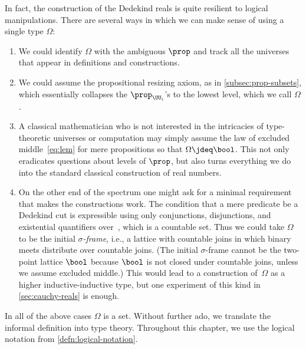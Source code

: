 In fact, the construction of the Dedekind reals is quite resilient to logical
manipulations. There are several ways in which we can make sense of using a single type
$\Omega$:
%
\begin{enumerate}

\item We could identify $\Omega$ with the ambiguous $\prop$ and track all the universes
  that appear in definitions and constructions.

\item We could assume the propositional resizing axiom,
  as in \cref{subsec:prop-subsets}, which essentially collapses the $\prop_{\UU_i}$'s to the
  lowest level, which we call $\Omega$.

\item A classical mathematician who is not interested in the intricacies of type-theoretic
  universes or computation may simply assume the law of excluded middle~\eqref{eq:lem} for
  mere propositions so that $\Omega \jdeq \bool$.
  This not only eradicates questions about
  levels of $\prop$, but also turns everything we do into the standard classical
  construction of real numbers.

\item On the other end of the spectrum one might ask for a minimal requirement that makes
  the constructions work. The condition that a mere predicate be a Dedekind cut is
  expressible using only conjunctions, disjunctions, and existential quantifiers over~\Q, which
  is a countable set. Thus we could take $\Omega$ to be the initial \emph{$\sigma$-frame},
  i.e., a lattice with countable joins in which binary meets distribute over countable
  joins. (The initial $\sigma$-frame cannot be the two-point lattice $\bool$ because
  $\bool$ is not closed under countable joins, unless we assume excluded middle.) This
  would lead to a construction of~$\Omega$ as a higher inductive-inductive type, but one
  experiment of this kind in \cref{sec:cauchy-reals} is enough.
\end{enumerate}

In all of the above cases $\Omega$ is a set.
%
Without further ado, we translate the informal definition into type theory.
Throughout this chapter, we use the
logical notation from \cref{defn:logical-notation}.

